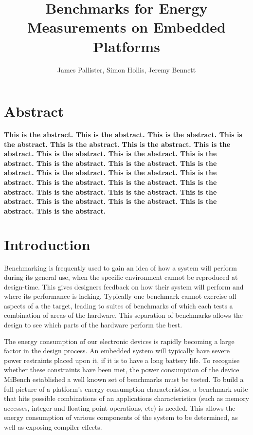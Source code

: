 \documentclass[twocolumn]{article}
\title{\bfseries\fontsize{22}{1}\selectfont Benchmarks for Energy Measurements on Embedded Platforms}
\author{James Pallister, Simon Hollis, Jeremy Bennett}
\newcommand{\nsection}[1]{\section{\bfseries #1}}
\begin{document}
\maketitle
\nsection{Abstract}

\textbf{This is the abstract. This is the abstract. This is the abstract. This is the abstract. This is the abstract. This is the abstract. This is the abstract. This is the abstract. This is the abstract. This is the abstract. This is the abstract. This is the abstract. This is the abstract. This is the abstract. This is the abstract. This is the abstract. This is the abstract. This is the abstract. This is the abstract. This is the abstract. This is the abstract. This is the abstract. This is the abstract. This is the abstract. This is the abstract. This is the abstract. }

\nsection{Introduction}

Benchmarking is frequently used to gain an idea of how a system will perform during its general use, when the specific environment cannot be reproduced at design-time. This gives designers feedback on how their system will perform and where its performance is lacking. Typically one benchmark cannot exercise all aspects of a the target, leading to suites of benchmarks of which each tests a combination of areas of the hardware. This separation of benchmarks allows the design to see which parts of the hardware perform the best.

The energy consumption of our electronic devices is rapidly becoming a large factor in the design process. An embedded system will typically have severe power restraints placed upon it, if it is to have a long battery life. To recognise whether these constraints have been met, the power consumption of the device MiBench established a well known set of benchmarks must be tested. To build a full picture of a platform’s energy consumption characteristics, a benchmark suite that hits possible combinations of an applications characteristics (such as memory accesses, integer and floating point operations, etc) is needed. This allows the energy consumption of various components of the system to be determined, as well as exposing compiler effects.
\end{document}
